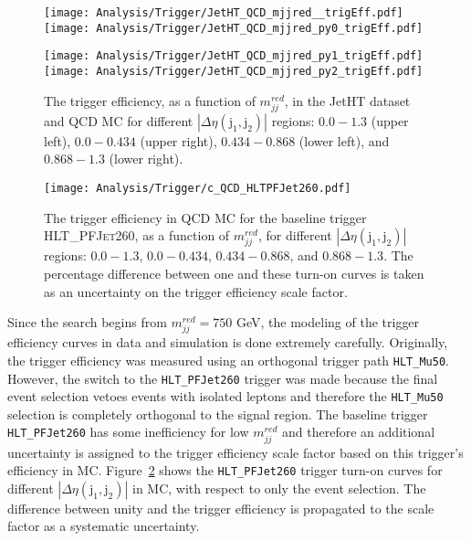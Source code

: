 \begin{figure}[h!]
  \begin{center}
    \texttt{[image: Analysis/Trigger/JetHT\_QCD\_mjjred\_\_trigEff.pdf]}
    \texttt{[image: Analysis/Trigger/JetHT\_QCD\_mjjred\_py0\_trigEff.pdf]}

    \texttt{[image: Analysis/Trigger/JetHT\_QCD\_mjjred\_py1\_trigEff.pdf]}
    \texttt{[image: Analysis/Trigger/JetHT\_QCD\_mjjred\_py2\_trigEff.pdf]}
  \end{center}
  \caption{The trigger efficiency, as a function of $m_{jj}^{red}$, in the JetHT dataset and QCD MC for different $|\Delta\eta(\mathrm{j}_{1}, \mathrm{j}_{2})|$ regions: $0.0-1.3$ (upper left), $0.0-0.434$ (upper right), $0.434-0.868$ (lower left), and $0.868-1.3$ (lower right).}
  \label{fig:trigeEffvsMjj_JetHT_DetaBins}
\end{figure}

\begin{figure}[h!]
  \begin{center}
    \texttt{[image: Analysis/Trigger/c\_QCD\_HLTPFJet260.pdf]}
  \end{center}
  \caption{The trigger efficiency in QCD MC for the baseline trigger \textsc{HLT\_PFJet260}, as a function of $m_{jj}^{red}$, for different $|\Delta\eta(\mathrm{j}_{1}, \mathrm{j}_{2})|$ regions: $0.0-1.3$, $0.0-0.434$, $0.434-0.868$, and $0.868-1.3$. The percentage difference between one and these turn-on curves is taken as an uncertainty on the trigger efficiency scale factor.}
  \label{fig:trigeEffvsMjj_QCDHT_HLTPFJet260_DEtabins}
\end{figure}

Since the search begins from $m_{jj}^{red} = 750$ GeV, the modeling of the trigger efficiency curves in data and simulation is done extremely carefully. Originally, the trigger efficiency was measured using an orthogonal trigger path \texttt{HLT\_Mu50}. However, the switch to the \texttt{HLT\_PFJet260} trigger was made because the final event selection vetoes events with isolated leptons and therefore the \texttt{HLT\_Mu50} selection is completely orthogonal to the signal region. The baseline trigger \texttt{HLT\_PFJet260} has some inefficiency for low $m_{jj}^{red}$ and therefore an additional uncertainty is assigned to the trigger efficiency scale factor based on this trigger's efficiency  in MC. Figure~\ref{fig:trigeEffvsMjj_QCDHT_HLTPFJet260_DEtabins} shows the \texttt{HLT\_PFJet260} trigger turn-on curves for different $|\Delta\eta(\mathrm{j}_{1}, \mathrm{j}_{2})|$ in MC, with respect to only the event selection. The difference between unity and the trigger efficiency is propagated to the scale factor as a systematic uncertainty. 

